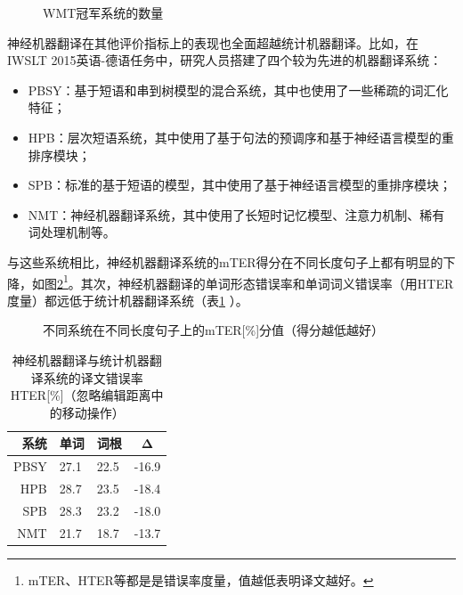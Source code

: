 \begin{figure}[htp]
\centering

\caption{WMT冠军系统的数量}
\label{fig:10-3}
\end{figure}

\parinterval  神经机器翻译在其他评价指标上的表现也全面超越统计机器翻译。比如，在IWSLT 2015英语-德语任务中，研究人员搭建了四个较为先进的机器翻译系统：

\begin{itemize}
\vspace{0.3em}
\item PBSY：基于短语和串到树模型的混合系统，其中也使用了一些稀疏的词汇化特征；
\vspace{0.3em}
\item HPB：层次短语系统，其中使用了基于句法的预调序和基于神经语言模型的重排序模块；
\vspace{0.3em}
\item SPB：标准的基于短语的模型，其中使用了基于神经语言模型的重排序模块；
\vspace{0.3em}
\item NMT：神经机器翻译系统，其中使用了长短时记忆模型、注意力机制、稀有词处理机制等。
\end{itemize}

\parinterval  与这些系统相比，神经机器翻译系统的mTER得分在不同长度句子上都有明显的下降，如图\ref{fig:10-4}\footnote{mTER、HTER等都是是错误率度量，值越低表明译文越好。}。其次，神经机器翻译的单词形态错误率和单词词义错误率（用HTER度量）都远低于统计机器翻译系统（表\ref{tab:10-1} ）。

\begin{figure}[htp]
\centering

\caption{不同系统在不同长度句子上的mTER[\%]分值（得分越低越好）}
\label{fig:10-4}
\end{figure}

\vspace{0.5em}%
\begin{table}[htp]
\centering
\caption{神经机器翻译与统计机器翻译系统的译文错误率HTER[\%]（忽略编辑距离中的移动操作）}
\label{tab:10-1}
\begin{tabular}{r|llc}
系统                    & 单词 & 词根 & Δ \\ \hline
PBSY                    & 27.1          & 22.5           & -16.9       \\
HPB                     & 28.7          & 23.5           & -18.4       \\
SPB                     & 28.3          & 23.2           & -18.0       \\
NMT                     & 21.7          & 18.7           & -13.7      \\
\end{tabular}
\end{table}

